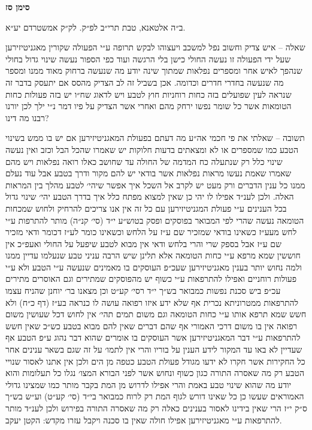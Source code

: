\documentclass[12pt, openany]{book}
\newcommand{\chapname}{}
\newcommand{\newchap}[1]{
	\addcontentsline{toc}{chapter}{#1}
	\renewcommand{\chapname}{#1}
		\begin{center}
			\textbf{%
\fontsize{16pt}{16pt}\selectfont
				#1}
		\end{center}
}
\begin{document}
\newchap{סימן סז}
\begin{multicols}{2}
ב״ה אלטאנא, טבת תרי״ב לפ״ק. לק״ק אמשטרדם יע״א.\\\vspace{0pt}

שאלה – איש צדיק וחשוב נפל למשכב ויעצוהו לבקש תרופה ע״י הפעולה שקורין מאגניטיזירען שעל ידי הפעולה זו נעשה החולי כישן בלי הרגשה ועוד כפי הספור נעשה שינוי גדול בחולי שנהפך לאיש אחר ומספרים נפלאות שמתוך שינה יודע מה שנעשה ברחוק מאוד ממנו ומספר מה שנעשה בחדרי חדרים וכדומה. אכן בשביל זה לב הצדיק מהסס אם יתעסק בדבר זה שנראה לעין שפועלים בזה כחות רוחניות חוץ לטבע ויש לדאוג שח״ו יש בזה פעולות כחות הטומאות אשר כל שומר נפשו ירחק מהם ואחרי אשר הצדיק על פיו דמר נ״י ילך לכן יורנו רבנו מה דינו?\\\vspace{0pt}

תשובה – שאלתי את פי חכמי אה״ע מה דעתם בפעולת המאגניטיזירען אם יש בו ממש בשינוי הטבע כמו שמספרים או לא ומצאתים בדעות חלוקות יש שאמרו שהכל הבל וכזב ואין נעשה שינוי כלל רק שנתעלה כח המדמה של החולה עד שחושב כאלו רואה נפלאות ויש מהם שאמרו שאמת נעשו מראות נפלאות אשר בודאי יש להם מקור ודרך בטבע אבל עוד נעלם ממנו כל ענין הדברים ורק מעט יש לקרב אל השכל איך אפשר שיהי׳ לטבע מהלך בין המראות האלה. ולכן לענ״ד אפילו לו יהי כן שאין למצוא מפתח כלל איך בדרך הטבע יהי׳ שינוי גדול בכל הענינים ע״י פעולת המגניטיזירען עם כל זה אין אנו צריכים להרחיק ולחוש שמכחות הטומאה נעשה שהרי לפי המבואר בפוסקים ופסק בטוש״ע י״ד (סי׳ קנ״ה) מותר להתרפות ע״י לחש מעע״ז כשאינו בודאי שמזכיר שם ע״ז על הלחש וכשאינו כומר לע״ז דכומר ודאי מזכיר שם ע״ז אבל בספק שרי והרי בלחש ודאי אין מבוא לטבע שיפעל על החולי ואעפ״כ אין חוששין שמא מרפא ע״י כחות הטומאה אלא תלינן שיש הרבה עניני טבע שנעלמו עדיין ממנו ולמה נחוש יותר בענין מאגניטיזירען שעכ״פ העוסקים בו מאמינים שנעשה ע״י הטבע ולא ע״י פעולות רוחניים ואפילו להתרפאות ע״י כשוף יש מהפוסקים שמתירים וגם האוסרים מתירים עכ״פ ביש סכנת נפשות כמבואר בש״ך י״ד רסי׳ קע״ט וכן מצאנו בר׳ יוחנן שהניח עצמו להתרפאות ממטרוניתא נכרית אף שלא ידע איזו רפואה עושה לו כנראה בע״ז (דף כ״ח) ולא חשש שמא תרפא אותו ע״י כחות הטומאה וגם משום תמים תהי׳ אין לחוש דכל שעושין משום רפואה אין בו משום דרכי האמורי אף שהם דברים שאין להם מבוא בטבע כש״כ שאין חשש להתרפאות ע״י דבר המאגניטיזירען אשר העוסקים בו אומרים שהוא דבר נהוג ע״פ הטבע אף שעדיין לא באו עד המקור לידע הענין על בוריו והרי אין לתמו׳ על זה שגם בשאר ענינים אחר כל החקירות אשר חקרו לא ידעו מגודל פעולת הטבע כטפה מן הים ולכן אין אתנו לאסור שנויי הטבע רק מה שאסרה התורה כגון כשוף ונחוש אשר לפני הבורא המצו׳ נגלו כל תעלומות והוא יודע מה שהוא שינוי טבע באמת והרי אפילו לדרוש מן המת בקבר מותר כמו שמצינו גדולי האמוראים שעשו כן כל שאינו דורש לגוף המת רק לרוח כמבואר בי״ד (סי׳ קע״ט) וע״ש בש״ך ס״ק י״ז הרי שאין בידינו לאסור בענינים כאלה רק מה שאסרה התורה בפירוש ולכן לענ״ד מותר להתרפאות ע״י מאגניטיזירען אפילו חולה שאין בו סכנה ויקבל עזרו מקדש: הקטן יעקב.\\\vspace{0pt}

\end{multicols}\newpage
\end{document}
